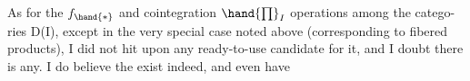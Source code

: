 As for the $f_{\hand{*}}$ and cointegration $\hand{\prod}_I$ operations among the catego-%
ries D(I), except in the very special case noted above (corresponding to
fibered products), I did not hit upon any ready-to-use candidate for it,
and I doubt there is any. I do believe the  exist indeed, and  even have

